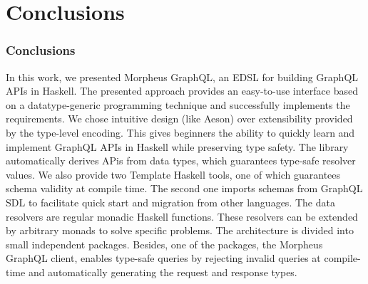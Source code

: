 \section{Conclusions}

\begin{frame}\frametitle{Conclusions}

In this work, we presented Morpheus GraphQL, an EDSL for building GraphQL APIs in Haskell. The presented approach provides an easy-to-use interface based on a datatype-generic programming technique and successfully implements the requirements. We chose intuitive design (like Aeson) over extensibility provided by the type-level encoding. 
This gives beginners the ability to quickly learn and implement GraphQL APIs in Haskell while preserving type safety.
The library automatically derives APis from data types, which guarantees type-safe resolver values. We also provide two Template Haskell tools, one of which guarantees schema validity at compile time. The second one imports schemas from GraphQL SDL to facilitate quick start and migration from other languages.
The data resolvers are regular monadic Haskell functions. These resolvers can be extended by arbitrary monads to solve specific problems.  The architecture is divided into small independent packages. Besides, one of the packages, the Morpheus GraphQL client, enables type-safe queries by rejecting invalid queries at compile-time and automatically generating the request and response types.
\end{frame}


